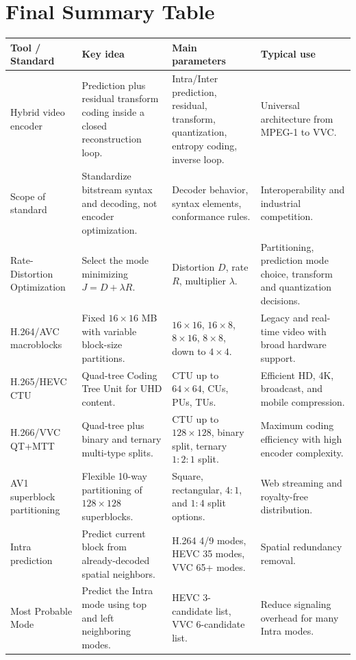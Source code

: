 \section{Final Summary Table}

\begin{center}
\begin{tabular}{|l|l|l|l|}
\hline
\textbf{Tool / Standard} & \textbf{Key idea} & \textbf{Main parameters} & \textbf{Typical use} \\ \hline
Hybrid video encoder & Prediction plus residual transform coding inside a closed reconstruction loop. & Intra/Inter prediction, residual, transform, quantization, entropy coding, inverse loop. & Universal architecture from MPEG-1 to VVC. \\ \hline
Scope of standard & Standardize bitstream syntax and decoding, not encoder optimization. & Decoder behavior, syntax elements, conformance rules. & Interoperability and industrial competition. \\ \hline
Rate-Distortion Optimization & Select the mode minimizing $J = D + \lambda R$. & Distortion $D$, rate $R$, multiplier $\lambda$. & Partitioning, prediction mode choice, transform and quantization decisions. \\ \hline
H.264/AVC macroblocks & Fixed $16 \times 16$ MB with variable block-size partitions. & $16 \times 16$, $16 \times 8$, $8 \times 16$, $8 \times 8$, down to $4 \times 4$. & Legacy and real-time video with broad hardware support. \\ \hline
H.265/HEVC CTU & Quad-tree Coding Tree Unit for UHD content. & CTU up to $64 \times 64$, CUs, PUs, TUs. & Efficient HD, 4K, broadcast, and mobile compression. \\ \hline
H.266/VVC QT+MTT & Quad-tree plus binary and ternary multi-type splits. & CTU up to $128 \times 128$, binary split, ternary $1:2:1$ split. & Maximum coding efficiency with high encoder complexity. \\ \hline
AV1 superblock partitioning & Flexible 10-way partitioning of $128 \times 128$ superblocks. & Square, rectangular, $4:1$, and $1:4$ split options. & Web streaming and royalty-free distribution. \\ \hline
Intra prediction & Predict current block from already-decoded spatial neighbors. & H.264 4/9 modes, HEVC 35 modes, VVC 65+ modes. & Spatial redundancy removal. \\ \hline
Most Probable Mode & Predict the Intra mode using top and left neighboring modes. & HEVC 3-candidate list, VVC 6-candidate list. & Reduce signaling overhead for many Intra modes. \\ \hline

\end{tabular}
\end{center}

